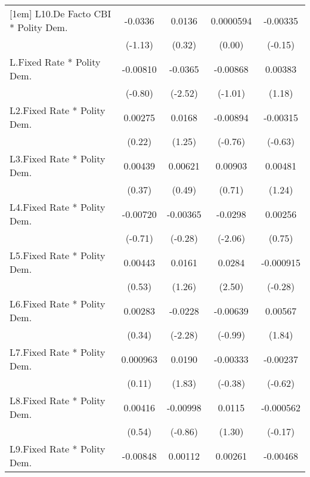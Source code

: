 {\begin{longtable}{l*{4}{c}}
[1em]
L10.De Facto CBI * Polity Dem.&  -0.0336         &   0.0136         &0.0000594         & -0.00335         \\
                &  (-1.13)         &   (0.32)         &   (0.00)         &  (-0.15)         \\
[1em]
L.Fixed Rate * Polity Dem.& -0.00810         &  -0.0365\sym{*}  & -0.00868         &  0.00383         \\
                &  (-0.80)         &  (-2.52)         &  (-1.01)         &   (1.18)         \\
[1em]
L2.Fixed Rate * Polity Dem.&  0.00275         &   0.0168         & -0.00894         & -0.00315         \\
                &   (0.22)         &   (1.25)         &  (-0.76)         &  (-0.63)         \\
[1em]
L3.Fixed Rate * Polity Dem.&  0.00439         &  0.00621         &  0.00903         &  0.00481         \\
                &   (0.37)         &   (0.49)         &   (0.71)         &   (1.24)         \\
[1em]
L4.Fixed Rate * Polity Dem.& -0.00720         & -0.00365         &  -0.0298\sym{*}  &  0.00256         \\
                &  (-0.71)         &  (-0.28)         &  (-2.06)         &   (0.75)         \\
[1em]
L5.Fixed Rate * Polity Dem.&  0.00443         &   0.0161         &   0.0284\sym{*}  &-0.000915         \\
                &   (0.53)         &   (1.26)         &   (2.50)         &  (-0.28)         \\
[1em]
L6.Fixed Rate * Polity Dem.&  0.00283         &  -0.0228\sym{*}  & -0.00639         &  0.00567         \\
                &   (0.34)         &  (-2.28)         &  (-0.99)         &   (1.84)         \\
[1em]
L7.Fixed Rate * Polity Dem.& 0.000963         &   0.0190         & -0.00333         & -0.00237         \\
                &   (0.11)         &   (1.83)         &  (-0.38)         &  (-0.62)         \\
[1em]
L8.Fixed Rate * Polity Dem.&  0.00416         & -0.00998         &   0.0115         &-0.000562         \\
                &   (0.54)         &  (-0.86)         &   (1.30)         &  (-0.17)         \\
[1em]
L9.Fixed Rate * Polity Dem.& -0.00848         &  0.00112         &  0.00261         & -0.00468         \\

\end{longtable}}
